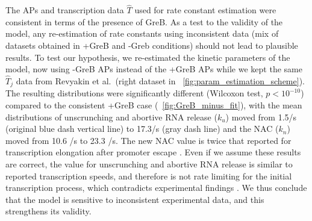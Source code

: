 
The APs \cite{hsu_initial_2006} and transcription data $\hat T$
\cite{revyakin_abortive_2006} used for rate constant estimation were
consistent in terms of the presence of GreB. As a test to the validity of the
model, any re-estimation of rate constants using inconsistent data (mix of
datasets obtained in +GreB and -Greb conditions) should not lead to plausible
results. To test our hypothesis, we re-estimated the kinetic parameters of the
model, now using -GreB APs \cite{hsu_initial_2006} instead of the +GreB APs
while we kept the same $\hat T_j$ data from Revyakin et al.\ (right dataset in
\FIG~\ref{fig:param_estimation_scheme}). The resulting distributions were
significantly different (Wilcoxon test, $p<10^{-10}$) compared to the
consistent +GreB case (\FIG~\ref{fig:GreB_minus_fit}), with the mean
distributions of unscrunching and abortive RNA release ($k_u$) moved from
1.5/s (original blue dash vertical line) to 17.3/s (gray dash line) and the
NAC ($k_n$) moved from 10.6 /s to 23.3 /s. The new NAC value is twice that
reported for transcription elongation after promoter escape
\cite{revyakin_abortive_2006}. Even if we assume these results are correct,
the value for unscrunching and abortive RNA release is similar to reported
transcription speeds, and therefore is not rate limiting for the initial
transcription process, which contradicts experimental findings
\cite{revyakin_abortive_2006, margeat_direct_2006}. We thus conclude that the
model is sensitive to inconsistent experimental data, and this strengthens its
validity.
